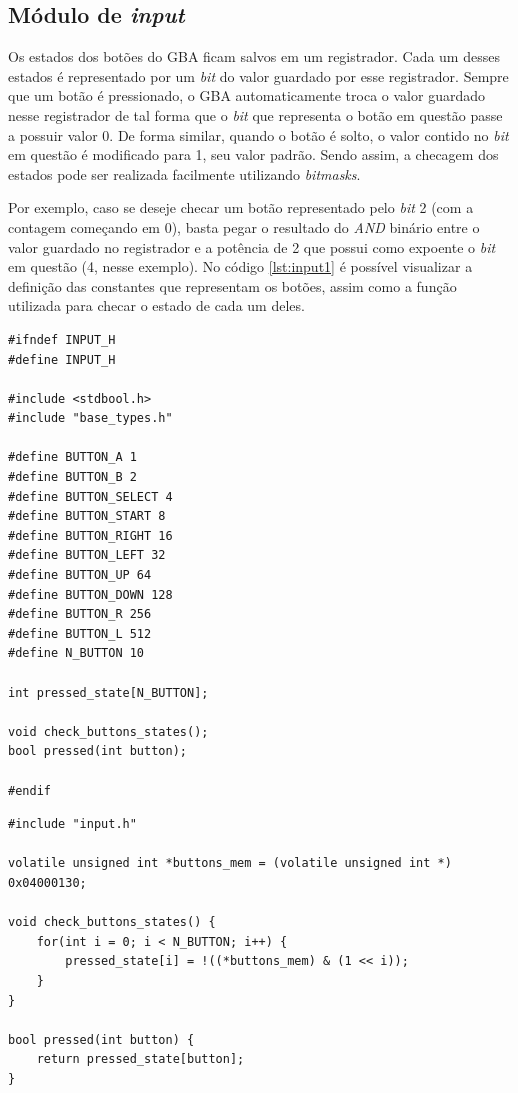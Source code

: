 \subsection{Módulo de \textit{input}}

Os estados dos botões do GBA ficam salvos em um registrador. Cada um desses estados é representado por um \textit{bit} do valor guardado por esse registrador. Sempre que um botão é pressionado, o GBA automaticamente troca o valor guardado nesse registrador de tal forma que o \textit{bit} que representa o botão em questão passe a possuir valor 0. De forma similar, quando o botão é solto, o valor contido no \textit{bit} em questão é modificado para 1, seu valor padrão. Sendo assim, a checagem dos estados pode ser realizada facilmente utilizando \textit{bitmasks}.

Por exemplo, caso se deseje checar um botão representado pelo \textit{bit} 2 (com a contagem começando em 0), basta pegar o resultado do \textit{AND} binário entre o valor guardado no registrador e a potência de 2 que possui como expoente o \textit{bit} em questão (4, nesse exemplo). No código \ref{lst:input1} é possível visualizar a definição das constantes que representam os botões, assim como a função utilizada para checar o estado de cada um deles.

\begin{lstlisting}[float,caption={Cabeçalho do módulo de \textit{input}.},label={lst:input1}]
#ifndef INPUT_H
#define INPUT_H

#include <stdbool.h>
#include "base_types.h"

#define BUTTON_A 1
#define BUTTON_B 2
#define BUTTON_SELECT 4
#define BUTTON_START 8
#define BUTTON_RIGHT 16
#define BUTTON_LEFT 32
#define BUTTON_UP 64
#define BUTTON_DOWN 128
#define BUTTON_R 256
#define BUTTON_L 512
#define N_BUTTON 10

int pressed_state[N_BUTTON];

void check_buttons_states();
bool pressed(int button);

#endif
\end{lstlisting}

\begin{lstlisting}[float,caption={Código-fonte do módulo de \textit{input}.}]
#include "input.h"

volatile unsigned int *buttons_mem = (volatile unsigned int *) 0x04000130;

void check_buttons_states() {
    for(int i = 0; i < N_BUTTON; i++) {
        pressed_state[i] = !((*buttons_mem) & (1 << i));
    }
}

bool pressed(int button) {
    return pressed_state[button];
}
\end{lstlisting}

